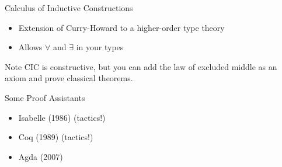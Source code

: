 \documentclass{beamer}
\begin{document}
\begin{frame}{Calculus of Inductive Constructions}
  \begin{itemize}
    \item Extension of Curry-Howard to a higher-order type theory
    \item Allows $\forall$ and $\exists$ in your types
  \end{itemize}
  \pause
  \begin{alertblock}{Note}
  CIC is constructive, but you can add
  the law of excluded middle as an axiom and prove classical theorems.
  \end{alertblock}
\end{frame}

\begin{frame}{Some Proof Assistants}
  \begin{itemize}
    \item Isabelle (1986) (tactics!)
    \item Coq (1989) (tactics!)
    \item Agda (2007)
  \end{itemize}
\end{frame}
\end{document}
